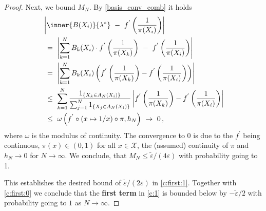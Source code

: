 \begin{proof}
Next, we bound $M_N$.
By \eqref{basis_conv_comb} it holds
\begin{align}
  \label{part_trick}
  \begin{split}
  &
\left| 
        \inner
       {B(X_i)}
       {\lambda^*}
       \ 
        -
        \ 
        f^{'}
        \left( 
          \frac{1}{\pi(X_i)}
     \right)
\right|
      \\
      &
      \ 
      =
      \ 
      \left| 
      \sum_{k=1}^{N} 
      B_k(X_i)
      \cdot
        f^{'}
        \left( 
          \frac{1}{\pi(X_k)}
          \right)
      \ 
      -
      \ 
        f^{'}
        \left( 
          \frac{1}{\pi(X_i)}
     \right)
      \right|
      \\
      &
      \ 
      =
      \ 
      \left| 
      \sum_{k=1}^{N} 
      B_k(X_i)
      \left( 
        f^{'}
        \left( 
          \frac{1}{\pi(X_k)}
     \right)
     -
        f^{'}
        \left( 
          \frac{1}{\pi(X_i)}
     \right)
      \right)
      \right|
      \\
      &
      \ 
      \le
      \ 
      \sum_{k=1}^{N} 
      \frac{1_{\left\{ X_k\in A_N(X_i) \right\}}}
      {
        \sum_{j=1}^{N} 
1_{\left\{ X_j\in A_N(X_i) \right\}}
      }
      \left| 
        f^{'}
        \left( 
          \frac{1}{\pi(X_k)}
     \right)
     -
        f^{'}
        \left( 
          \frac{1}{\pi(X_i)}
     \right)
      \right|
      \\
      &
      \ 
      \le
      \ 
      \omega
      \left( f^{'}\circ (x\mapsto1/x)\circ \pi,h_N \right)
      \ 
      \to
      \ 
      0
      \,,
\end{split}
\end{align}
where $\omega$ is the modulus of continuity.
The convergence to 0 is due to the $f^{'}$ being continuous, $\pi(x)\in(0,1)$ for all $x\in\mathcal{X}$, the (assumed) continuity of $\pi$ and $h_N\to 0$ for $N\to\infty$.
We conclude, that $
M_N\le
\tilde{\varepsilon}
/
(4\varepsilon)
$
with probability going to 1.

This establishes the desired bound of 
$
\tilde{\varepsilon}/(2\varepsilon)
$
in \eqref{c:first:1}.
Together with \eqref{c:first:0}
we conclude that the \textbf{first term} 
in
\eqref{c:1}
is bounded below by
$
-
\tilde{\varepsilon}/2
$
with probability going to $1$ as $N\to\infty$.

\end{proof}
